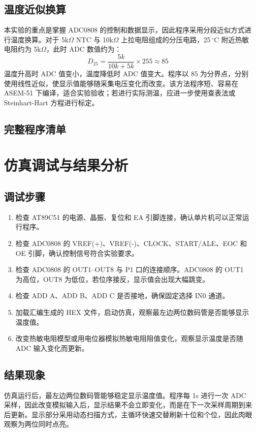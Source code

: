 \subsection{温度近似换算}
本实验的重点是掌握 ADC0808 的控制和数据显示，因此程序采用分段近似方式进行温度换算。对于 5k$\Omega$ NTC 与 10k$\Omega$ 上拉电阻组成的分压电路，25\,$^\circ$C 附近热敏电阻约为 5k$\Omega$，此时 ADC 数值约为：
\[
  D_{25} = \frac{5k}{10k + 5k} \times 255 \approx 85
\]
温度升高时 ADC 值变小，温度降低时 ADC 值变大。程序以 85 为分界点，分别使用线性近似，使显示值能够随采集电压变化而改变。该方法程序短、容易在 ASEM-51 下编译，适合实验验收；若进行实际测温，应进一步使用查表法或 Steinhart-Hart 方程进行标定。

\subsection{完整程序清单}
\lstset{style=a51style}


\section{仿真调试与结果分析}

\subsection{调试步骤}
\begin{enumerate}
  \item 检查 AT89C51 的电源、晶振、复位和 EA 引脚连接，确认单片机可以正常运行程序。
  \item 检查 ADC0808 的 VREF(+)、VREF(-)、CLOCK、START/ALE、EOC 和 OE 引脚，确认控制信号符合实验要求。
  \item 检查 ADC0808 的 OUT1--OUT8 与 P1 口的连接顺序。ADC0808 的 OUT1 为高位，OUT8 为低位，若位序接反，显示值会出现大幅跳变。
  \item 检查 ADD A、ADD B、ADD C 是否接地，确保固定选择 IN0 通道。
  \item 加载汇编生成的 HEX 文件，启动仿真，观察最左边两位数码管是否能够显示温度值。
  \item 改变热敏电阻模型或用电位器模拟热敏电阻阻值变化，观察显示温度是否随 ADC 输入变化而更新。
\end{enumerate}

\subsection{结果现象}
仿真运行后，最左边两位数码管能够稳定显示温度值。程序每 1s 进行一次 ADC 采样，因此改变模拟输入后，显示结果不会立即变化，而是在下一次采样周期到来后更新。显示部分采用动态扫描方式，主循环快速交替刷新十位和个位，因此肉眼观察为两位同时点亮。

